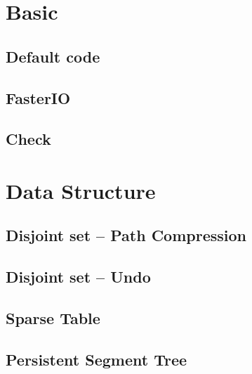 \documentclass[a4paper,10pt,twocolumn,oneside]{article}
\begin{document}
\pagestyle{fancy}
\fancyfoot{}
\fancyhead[R]{\thepage}
\renewcommand{\headrulewidth}{0.4pt}
\renewcommand{\contentsname}{Contents} 

\scriptsize
\tableofcontents

\newpage

\section{Basic}
\subsection{Default code}


\subsection{FasterIO}


\subsection{Check}


\section{Data Structure}
\subsection{Disjoint set -- Path Compression}


\subsection{Disjoint set -- Undo}


\subsection{Sparse Table}



\subsection{Persistent Segment Tree}

\end{document}

